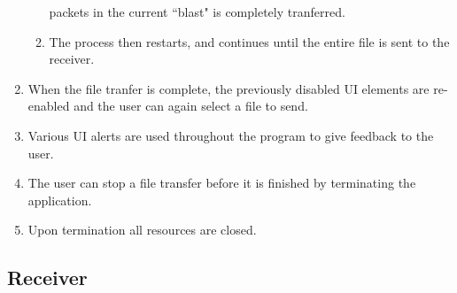 \documentclass[10pt, a4paper]{article}
\begin{document}
\begin{enumerate}
\begin{enumerate}
        packets in the current ``blast" is completely tranferred.
      \item The process then restarts, and continues until the entire file is
        sent to the receiver.
    \end{enumerate}
  \item When the file tranfer is complete, the previously disabled UI elements
    are re-enabled and the user can again select a file to send.
  \item Various UI alerts are used throughout the program to give feedback to
    the user.
  \item The user can stop a file transfer before it is finished by terminating
    the application.
  \item Upon termination all resources are closed.
\end{enumerate}

\subsection{Receiver}
\label{subsec:prog-desc-receiver}
\end{document}
